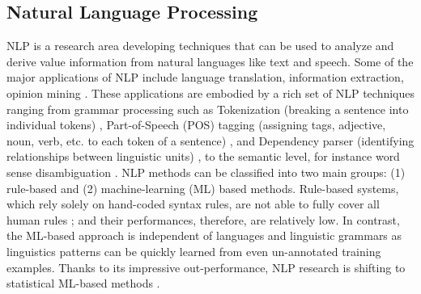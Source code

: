 \documentclass[Journal, BackFigs,NoLists, DoubleSpace]{ascelike}%
\begin{document}
\subsection{Natural Language Processing}
%
NLP is a research area developing techniques that can be used to analyze and derive value information from natural languages like text and speech. Some of the major applications of NLP include language translation, information extraction, opinion mining \cite{Cambria14}. These applications are embodied by a rich set of NLP techniques ranging from grammar processing such as Tokenization (breaking a sentence into individual tokens) \cite{Webster92,Zhao11},  Part-of-Speech (POS) tagging (assigning tags, adjective, noun, verb, etc. to each token of a sentence) \cite{Toutanova03,Cunningham02}, and Dependency parser (identifying relationships between linguistic units) \cite{chen14}, to the semantic level, for instance word sense disambiguation \cite{Lesk86,Yarowsky95,Navigli09}. NLP methods can be classified into two main groups: (1) rule-based and (2) machine-learning (ML) based methods. Rule-based systems, which rely solely on hand-coded syntax rules, are not able to fully cover all human rules \cite{Marcus95}; and their performances, therefore, are relatively low. In contrast, the ML-based approach is independent of languages and linguistic grammars \cite{costa-jussa12} as linguistics patterns can be quickly learned from even un-annotated training examples. Thanks to its impressive out-performance, NLP research is shifting to statistical ML-based methods \cite{Cambria14}. 
%
\end{document}
